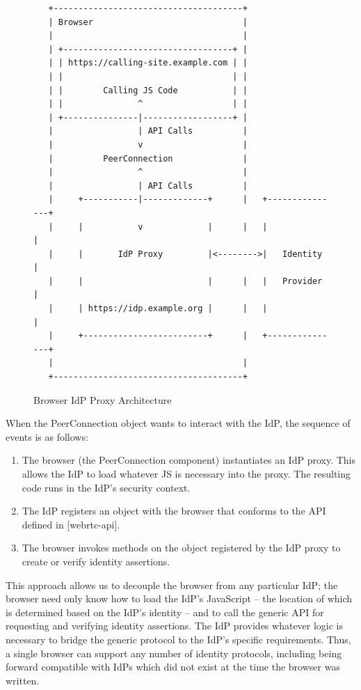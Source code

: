 \documentclass{article}
\begin{document}
\begin{figure}[ht]
\begin{verbatim}
   +--------------------------------------+
   | Browser                              |
   |                                      |
   | +----------------------------------+ |
   | | https://calling-site.example.com | |
   | |                                  | |
   | |        Calling JS Code           | |
   | |               ^                  | |
   | +---------------|------------------+ |
   |                 | API Calls          |
   |                 v                    |
   |          PeerConnection              |
   |                 ^                    |
   |                 | API Calls          |
   |     +-----------|-------------+      |   +---------------+
   |     |           v             |      |   |               |
   |     |       IdP Proxy         |<-------->|   Identity    |
   |     |                         |      |   |   Provider    |
   |     | https://idp.example.org |      |   |               |
   |     +-------------------------+      |   +---------------+
   |                                      |
   +--------------------------------------+
\end{verbatim}
\caption{Browser IdP Proxy Architecture}
\label{fig:idp-proxy}
\end{figure}

When the PeerConnection object wants to interact with the IdP, the
sequence of events is as follows:

\begin{enumerate}
\item The browser (the PeerConnection component) instantiates an IdP
  proxy.  This allows the IdP to load whatever JS is necessary into
  the proxy.  The resulting code runs in the IdP's security
  context.

\item The IdP registers an object with the browser that conforms to the
  API defined in [webrtc-api].

\item The browser invokes methods on the object registered by the IdP
  proxy to create or verify identity assertions.
\end{enumerate}

This approach allows us to decouple the browser from any particular
IdP; the browser need only know how to load the IdP's JavaScript --
the location of which is determined based on the IdP's identity --
and to call the generic API for requesting and verifying identity
assertions.  The IdP provides whatever logic is necessary to bridge
the generic protocol to the IdP's specific requirements.  Thus, a
single browser can support any number of identity protocols,
including being forward compatible with IdPs which did not exist at
the time the browser was written.
\end{document}
